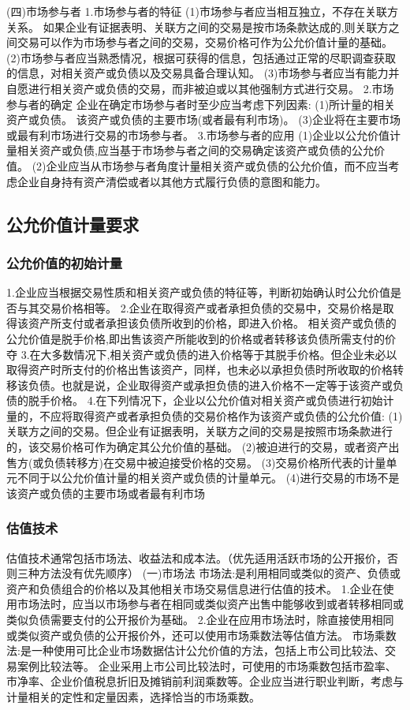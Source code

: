 \documentclass[UTF8,12pt]{ctexart}
\numberwithin{equation}{section} %
\numberwithin{figure}{section}
\numberwithin{table}{section}
\begin{document}
	(四)市场参与者
	1.市场参与者的特征
	(1)市场参与者应当相互独立，不存在关联方关系。
	如果企业有证据表明、关联方之间的交易是按市场条款达成的,则关联方之间交易可以作为市场参与者之间的交易，交易价格可作为公允价值计量的基础。
	(2)市场参与者应当熟悉情况，根据可获得的信息，包括通过正常的尽职调查获取的信息，对相关资产或负债以及交易具备合理认知。
	(3)市场参与者应当有能力并自愿进行相关资产或负债的交易，而非被迫或以其他强制方式进行交易。
	2.市场参与者的确定
	企业在确定市场参与者时至少应当考虑下列因素:
	(1)所计量的相关资产或负债。
	该资产或负债的主要市场(或者最有利市场)。
	(3)企业将在主要市场或最有利市场进行交易的市场参与者。
	3.市场参与者的应用
	(1)企业以公允价值计量相关资产或负债,应当基于市场参与者之间的交易确定该资产或负债的公允价值。
	(2)企业应当从市场参与者角度计量相关资产或负债的公允价值，而不应当考虑企业自身持有资产清偿或者以其他方式履行负债的意图和能力。
	
	\subsection{公允价值计量要求}
	\subsubsection{公允价值的初始计量}
	1.企业应当根据交易性质和相关资产或负债的特征等，判断初始确认时公允价值是否与其交易价格相等。
	2.企业在取得资产或者承担负债的交易中，交易价格是取得该资产所支付或者承担该负债所收到的价格，即进入价格。
	相关资产或负债的公允价值是脱手价格,即出售该资产所能收到的价格或者转移该负债所需支付的价夺
	3.在大多数情况下,相关资产或负债的进入价格等于其脱手价格。但企业未必以取得资产时所支付的价格出售该资产，同样，也未必以承担负债时所收取的价格转移该负债。也就是说，企业取得资产或承担负债的进入价格不一定等于该资产或负债的脱手价格。
	4.在下列情况下，企业以公允价值对相关资产或负债进行初始计量的，不应将取得资产或者承担负债的交易价格作为该资产或负债的公允价值:
	(1)关联方之间的交易。但企业有证据表明，关联方之间的交易是按照市场条款进行的，该交易价格可作为确定其公允价值的基础。
	(2)被迫进行的交易，或者资产出售方(或负债转移方)在交易中被迫接受价格的交易。
	(3)交易价格所代表的计量单元不同于以公允价值计量的相关资产或负债的计量单元。
	(4)进行交易的市场不是该资产或负债的主要市场或者最有利市场
	\subsubsection{估值技术}
	估值技术通常包括市场法、收益法和成本法。（优先适用活跃市场的公开报价，否则三种方法没有优先顺序）
	(一)市场法
	市场法:是利用相同或类似的资产、负债或资产和负债组合的价格以及其他相关市场交易信息进行估值的技术。
	1.企业在使用市场法时，应当以市场参与者在相同或类似资产出售中能够收到或者转移相同或类似负债需要支付的公开报价为基础。
	2.企业在应用市场法时，除直接使用相同或类似资产或负债的公开报价外，还可以使用市场乘数法等估值方法。
	市场乘数法:是一种使用可比企业市场数据估计公允价值的方法，包括上市公司比较法、交易案例比较法等。
	企业采用上市公司比较法时，可使用的市场乘数包括市盈率、市净率、企业价值税息折旧及摊销前利润乘数等。企业应当进行职业判断，考虑与计量相关的定性和定量因素，选择恰当的市场乘数。
	
\end{document}
